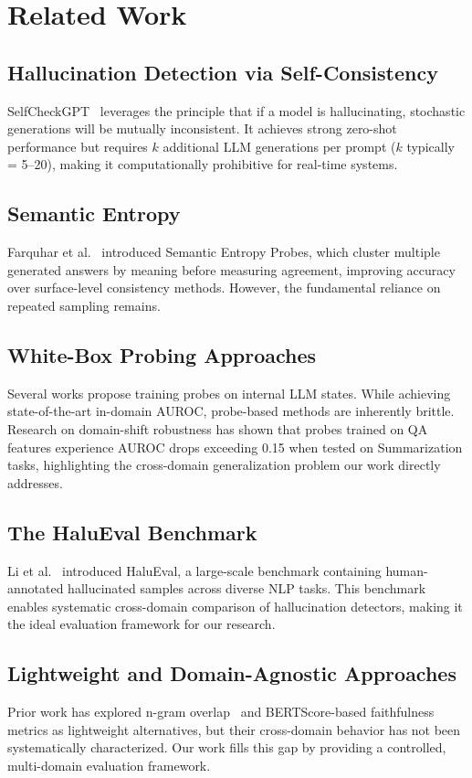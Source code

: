 \documentclass[conference]{IEEEtran}
\begin{document}
\section{Related Work}

\subsection{Hallucination Detection via Self-Consistency}
SelfCheckGPT~\cite{manakul2023selfcheck} leverages the principle that if a model is hallucinating, stochastic generations will be mutually inconsistent. It achieves strong zero-shot performance but requires $k$ additional LLM generations per prompt ($k$ typically = 5–20), making it computationally prohibitive for real-time systems.

\subsection{Semantic Entropy}
Farquhar et al.~\cite{farquhar2024semantic} introduced Semantic Entropy Probes, which cluster multiple generated answers by meaning before measuring agreement, improving accuracy over surface-level consistency methods. However, the fundamental reliance on repeated sampling remains.

\subsection{White-Box Probing Approaches}
Several works propose training probes on internal LLM states. While achieving state-of-the-art in-domain AUROC, probe-based methods are inherently brittle. Research on domain-shift robustness has shown that probes trained on QA features experience AUROC drops exceeding 0.15 when tested on Summarization tasks, highlighting the cross-domain generalization problem our work directly addresses.

\subsection{The HaluEval Benchmark}
Li et al.~\cite{li2023halueval} introduced HaluEval, a large-scale benchmark containing human-annotated hallucinated samples across diverse NLP tasks. This benchmark enables systematic cross-domain comparison of hallucination detectors, making it the ideal evaluation framework for our research.

\subsection{Lightweight and Domain-Agnostic Approaches}
Prior work has explored n-gram overlap~\cite{manakul2023selfcheck} and BERTScore-based faithfulness metrics as lightweight alternatives, but their cross-domain behavior has not been systematically characterized. Our work fills this gap by providing a controlled, multi-domain evaluation framework.
\end{document}
